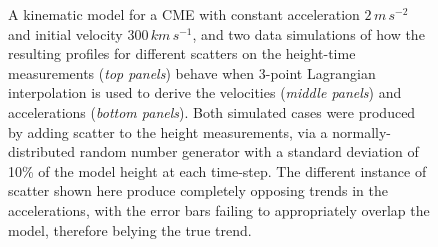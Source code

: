 \documentclass[structabstract]{aa}
\begin{document}
\begin{figure}[!t]
\caption{A kinematic model for a CME with constant acceleration $2\,m\,s^{-2}$ and initial velocity $300\,km\,s^{-1}$, and two data simulations of how the resulting profiles for different scatters on the height-time measurements (\emph{top panels}) behave when 3-point Lagrangian interpolation is used to derive the velocities (\emph{middle panels}) and accelerations (\emph{bottom panels}). Both simulated cases were produced by adding scatter to the height measurements, via a normally-distributed random number generator with a standard deviation of 10\% of the model height at each time-step. The different instance of scatter shown here produce completely opposing trends in the accelerations, with the error bars failing to appropriately overlap the model, therefore belying the true trend.}
\label{sim_vels_thesis}
\end{figure}
\end{document}

